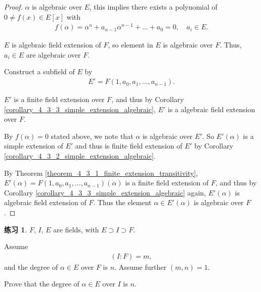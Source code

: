 \documentclass[utf8]{ctexbook}
\theoremstyle{definition}
\newtheorem{exercise}{练习}[section]
\begin{document}
\begin{proof}
$\alpha$ is algebraic over $E$, this implies there exists a polynomial of $0 \neq f(x) \in E[x]$ with
\begin{align*}
f(\alpha) = \alpha^n + a_{n-1} \alpha^{n-1} + \ldots + a_0 = 0, \quad a_i \in E .
\end{align*}

$E$ is algebraic field extension of $F$, so element in $E$ is algebraic over $F$. Thus, $a_i \in E $ are algebraic over $F$.

Construct a subfield of $E$ by
\begin{align*}
E' = F(1, a_0, a_1,  \ldots, a_{n-1} ) .
\end{align*}

$E'$ is a finite field extension over $F$, and thus by Corollary \ref{corollary_4_3_3_simple_extension_algebraic}, $E'$ is a algebraic field extension over $F$.

By $f(\alpha)=0$ stated above, we note that $\alpha$ is algebraic over $E'$. So $E' (\alpha)$ is a simple extension of $E'$ and thus is finite field extension of $E'$ by Corollary \ref{corollary_4_3_2_simple_extension_algebraic}. 

By Theorem \ref{theorem_4_3_1_finite_extension_transitivity}, $E'(\alpha) = F(1, a_0, a_1,  \ldots, a_{n-1} ) (\alpha) $ is a finite field extension of $F$, and thus by Corollary \ref{corollary_4_3_3_simple_extension_algebraic} again, $E'(\alpha)$ is algebraic field extension of $F$. Thus the element $\alpha \in E' (\alpha)$ is algebraic over $F$.

\end{proof}


\begin{exercise}
$F$, $I$, $E$ are fields, with $E \supset I \supset F$.

Assume 
\begin{align*}
(I:F) = m ,
\end{align*}
and the degree of $\alpha \in E$ over $F$ is $n$. Assume further $(m,n) = 1$.

Prove that the degree of $\alpha \in E$ over $I$ is $n$.

\end{exercise}
\end{document}
